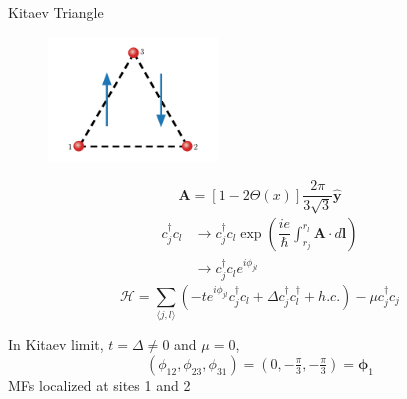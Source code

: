\documentclass[xcolor=dvipsnames,10pt,aspectratio=169]{beamer}
\let\oldhat\hat
\renewcommand{\hat}[1]{\oldhat{\mathbf{#1}}}
\renewcommand{\vec}[1]{\mathbf{#1}}
\newcommand{\ham}{\mathcal{H}}
\newcommand{\cc}{c^{\dagger}}
\newcommand{\de}{\Delta}
\begin{document}
  \begin{frame}{Kitaev Triangle}
    \footnotesize
    \begin{multicols}{2}
      \begin{figure}
        \includegraphics[width=0.4\textwidth]{./figures/3-point-triangle.pdf}
      \end{figure}
      \begin{equation}
        \vec{A} = \left[1-2\Theta(x) \right] \dfrac{2\pi}{3\sqrt{3}} \hat{y}
      \end{equation}
      \begin{align}
        \cc_j c_l &\rightarrow \cc_j c_l \exp \left(\dfrac{i e}{\hbar} \int_{r_j}^{r_l} \vec{A} \cdot d\vec{l} \right) \nonumber \\
        &\rightarrow \cc_j c_l e^{i \phi_{jl}}
      \end{align}
      \begin{equation} \label{eq: Peierls chain}
        \ham = \sum_{\langle j,l\rangle} (-t e^{i\phi_{jl}} \cc_j c_l + \de \cc_j\cc_l + h.c.) - \mu \cc_j c_j
      \end{equation}
    \end{multicols}

    In Kitaev limit, $t=\de\neq0$ and $\mu=0$,
    \begin{equation}
      (\phi_{12}, \phi_{23}, \phi_{31}) = (0, -\tfrac{\pi}{3}, -\tfrac{\pi}{3}) = \bm\phi_1
    \end{equation}
    MFs localized at sites 1 and 2

  \end{frame}
\end{document}
